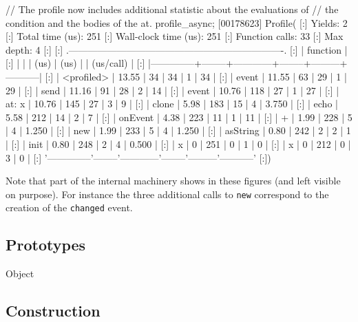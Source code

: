 \begin{urbiscript}
// The profile now includes additional statistic about the evaluations of
// the condition and the bodies of the at.
profile_async;
[00178623] Profile(
[:]  Yields:                    2
[:]  Total time (us):         251
[:]  Wall-clock time (us):    251
[:]  Function calls:           33
[:]  Max depth:                 4
[:]
[:]  .-------------------------------------------------------------------.
[:]  |   function   |   %
[:]  |              |        |    (us)    |  (us)  |         | (us/call) |
[:]  |--------------+--------+------------+--------+---------+-----------|
[:]  |   <profiled> |  13.55 |         34 |     34 |       1 |        34 |
[:]  |        event |  11.55 |         63 |     29 |       1 |        29 |
[:]  |         send |  11.16 |         91 |     28 |       2 |        14 |
[:]  |        event |  10.76 |        118 |     27 |       1 |        27 |
[:]  |    at: { x } |  10.76 |        145 |     27 |       3 |         9 |
[:]  |        clone |   5.98 |        183 |     15 |       4 |     3.750 |
[:]  |         echo |   5.58 |        212 |     14 |       2 |         7 |
[:]  |      onEvent |   4.38 |        223 |     11 |       1 |        11 |
[:]  |            + |   1.99 |        228 |      5 |       4 |     1.250 |
[:]  |          new |   1.99 |        233 |      5 |       4 |     1.250 |
[:]  |     asString |   0.80 |        242 |      2 |       2 |         1 |
[:]  |         init |   0.80 |        248 |      2 |       4 |     0.500 |
[:]  |            x |      0 |        251 |      0 |       1 |         0 |
[:]  |            x |      0 |        212 |      0 |       3 |         0 |
[:]  '--------------'--------'------------'--------'---------'-----------'
[:])
\end{urbiscript}

Note that part of the internal machinery shows in these figures (and left
visible on purpose).  For instance the three additional calls to
\lstinline{new} correspond to the creation of the \lstinline{changed} event.

\subsection{Prototypes}

\begin{refObjects}
\item[Object]
\end{refObjects}

\subsection{Construction}

